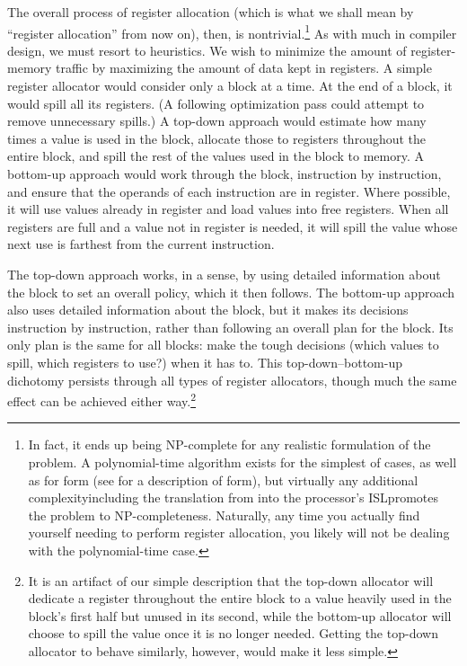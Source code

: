 The overall process of register allocation (which is what we shall mean by ``register allocation'' from now on), then, is nontrivial.\footnote{In fact, it ends up being NP-complete for any realistic formulation of the problem. A polynomial-time algorithm exists for the simplest of cases, as well as for \SSA form (see  for a description of \SSA form), but virtually any additional complexity\empause including the translation from \SSA into the processor's ISL\empause promotes the problem to NP-completeness. Naturally, any time you actually find yourself needing to perform register allocation, you likely will not be dealing with the polynomial-time case.} As with much in compiler design, we must resort to heuristics. We wish to minimize the amount of register-memory traffic by maximizing the amount of data kept in registers. A simple register allocator would consider only a block at a time. At the end of a block, it would spill all its registers. (A following optimization pass could attempt to remove unnecessary spills.) A top-down approach would estimate how many times a value is used in the block, allocate those to registers throughout the entire block, and spill the rest of the values used in the block to memory. A bottom-up approach would work through the block, instruction by instruction, and ensure that the operands of each instruction are in register. Where possible, it will use values already in register and load values into free registers. When all registers are full and a value not in register is needed, it will spill the value whose next use is farthest from the current instruction.

The top-down approach works, in a sense, by using detailed information about the block to set an overall policy, which it then follows. The bottom-up approach also uses detailed information about the block, but it makes its decisions instruction by instruction, rather than following an overall plan for the block. Its only plan is the same for all blocks: make the tough decisions (which values to spill, which registers to use?) when it has to. This top-down--bottom-up dichotomy persists through all types of register allocators, though much the same effect can be achieved either way.\footnote{It is an artifact of our simple description that the top-down allocator will dedicate a register throughout the entire block to a value heavily used in the block's first half but unused in its second, while the bottom-up allocator will choose to spill the value once it is no longer needed. Getting the top-down allocator to behave similarly, however, would make it less simple.}

